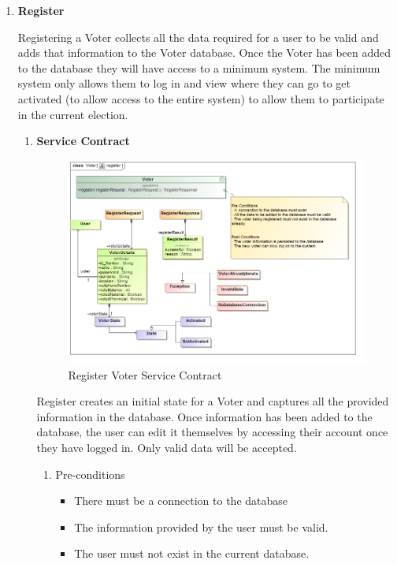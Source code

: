 \begin{enumerate}
	\item \textbf{Register}
	
	Registering a Voter collects all the data required for a user to be valid and adds that information to the Voter database. Once the Voter has been added to the database they will have access to a minimum system. The minimum system only allows them to log in and view where they can go to get activated (to allow access to the entire system) to allow them to participate in the current election.
	
		\begin{enumerate}
			\item \textbf{Service Contract}
				\begin{figure}[H]
					\centering
					\includegraphics[width=0.75\linewidth]{../Images/Voter/ServiceContracts/register_serviceContract.png}
					\caption{Register Voter Service Contract}
				\end{figure}
				
			Register creates an initial state for a Voter and captures all the provided information in the database. Once information has been added to the database, the user can edit it themselves by accessing their account once they have logged in. Only valid data will be accepted. 
				\newline				
				
				\begin{enumerate}
					\item Pre-conditions
					\begin{itemize}
						\item There must be a connection to the database
						\item The information provided by the user must be valid.
						\item The user must not exist in the current database. 
					\end{itemize}
					

\end{enumerate}
\end{enumerate}
\end{enumerate}
